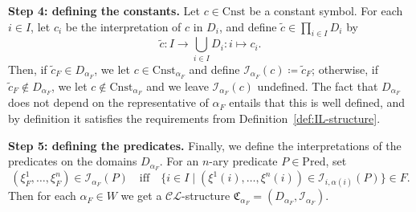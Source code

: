 \documentclass[submission,copyright,creativecommons]{eptcs}
\newcommand{\mo}{\mathfrak}
\renewcommand{\iff}{\quad\text{iff}\quad}
\newcommand{\Con}{\mathrm{Cnst}}
\newcommand{\Pred}{\mathrm{Pred}}
\newcommand{\II}{\mathscr{I}}
\newcommand{\CL}{\mathscr{C\!\!L}}   %
\begin{document}
  \smallskip\noindent
  \textbf{Step 4: defining the constants.}
  Let $c \in \Con$ be a constant symbol.
  For each $i \in I$, let $c_i$ be the interpretation of $c$
  in $D_i$, and define $\tilde{c} \in \prod_{i \in I} D_i$ by
  \begin{equation*}
    \tilde{c} : I \to \bigcup_{i \in I} D_i : i \mapsto c_i.
  \end{equation*}
  Then, if $\tilde{c}_F \in D_{\alpha_F}$, we let $c \in \Con_{\alpha_F}$ and
  define $\II_{\alpha_F}(c) \coloneq \tilde{c}_F$; otherwise, if $\tilde{c}_F \notin D_{\alpha_F}$, we let $c \notin \Con_{\alpha_F}$
  and we leave $\II_{\alpha_F}(c)$ undefined.
%
  The fact that $D_{\alpha_F}$ does not depend on the representative
  of $\alpha_F$ entails that this is well defined, and by definition it
  satisfies the requirements from Definition~\ref{def:IL-structure}.

  \bigskip\noindent
  \textbf{Step 5: defining the predicates.}
    Finally, we define the interpretations of the predicates
    on the domains $D_{\alpha_F}$.
    For an $n$-ary predicate $P \in \Pred$, set
    \begin{equation*}
      (\xi_F^1, \ldots, \xi_F^n) \in \II_{\alpha_F}(P)
        \iff \{ i \in I \mid (\xi^1(i), \ldots, \xi^n(i)) \in \II_{i, \alpha(i)}(P) \} \in F.
    \end{equation*}
    Then for each $\alpha_F \in W$ we get a $\CL$-structure
    $\mo{C}_{\alpha_F} = (D_{\alpha_F}, \II_{\alpha_F})$.
\end{document}
